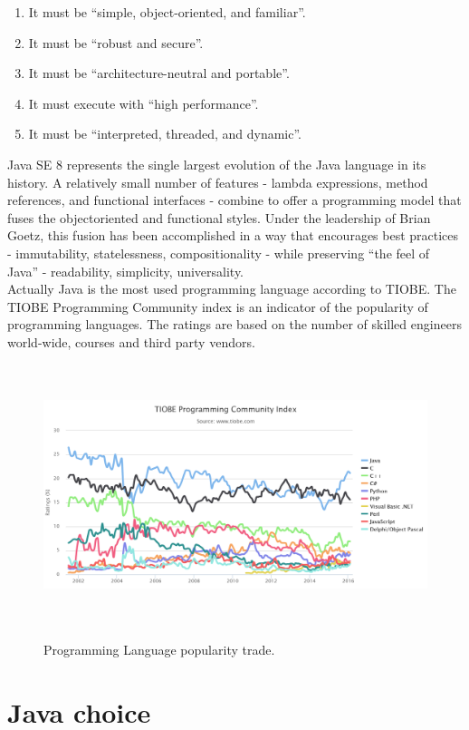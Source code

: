 \begin{enumerate}
\item It must be ``simple, object-oriented, and familiar''.
\item It must be ``robust and secure''.
\item It must be ``architecture-neutral and portable''.
\item It must execute with ``high performance''.
\item It must be ``interpreted, threaded, and dynamic''.
\end{enumerate}


Java SE 8 represents the single largest evolution of the Java language in its history. A relatively small number of features - lambda expressions, method references, and functional interfaces - combine to offer a programming model that fuses the objectoriented
and functional styles. Under the leadership of Brian Goetz, this fusion has been accomplished in a way that encourages best practices - immutability, statelessness, compositionality - while preserving ``the feel of Java'' - readability, simplicity, universality.\\
Actually Java is the most used programming language according to TIOBE. The TIOBE Programming Community index is an indicator of the popularity of programming languages. The ratings are based on the number of skilled engineers world-wide, courses and third party vendors.



\begin{figure}[H]
\centering
{\includegraphics[height=7.6cm ]{Immagini/trend.png}} 
\caption{Programming Language popularity trade.}
\label{fig:hl}
\end{figure}


\section{Java choice}

